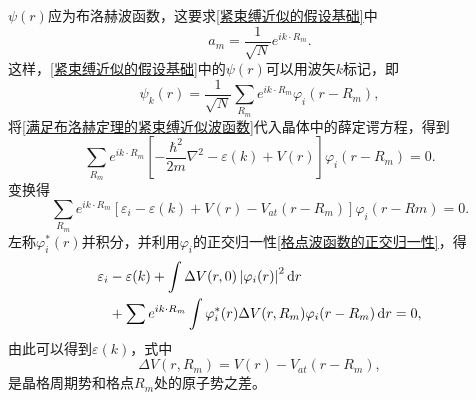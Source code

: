                 $\psi(r)$应为布洛赫波函数，这要求\autoref{紧束缚近似的假设基础}中
                \begin{equation}
                    a_m=\frac{1}{\sqrt{N}}e^{ik\cdot R_m}.
                \end{equation}
                这样，\autoref{紧束缚近似的假设基础}中的$\psi(r)$可以用波矢$k$标记，即
                \begin{equation}
                    \psi_k(r)=\frac{1}{\sqrt{N}}\sum_{R_m}e^{ik\cdot R_m}\varphi_i(r-R_m)\label{满足布洛赫定理的紧束缚近似波函数},
                \end{equation}
                将\autoref{满足布洛赫定理的紧束缚近似波函数}代入晶体中的薛定谔方程，得到
                \begin{equation}
                    \sum_{R_m}e^{ik\cdot R_m}\left[ - \frac{\hbar^2}{2m}\nabla^2 - \varepsilon(k)+V(r) \right]\varphi_i(r-R_m)=0.
                \end{equation}
                变换得
                \begin{equation}
                    \sum_{R_m}e^{ik\cdot R_m}\left[ \varepsilon_i-\varepsilon(k)+V(r)-V_{at}(r-R_m) \right]\varphi_i(r-Rm)=0.
                \end{equation}
                左称$\varphi_i^*(r)$并积分，并利用$\varphi_i$的正交归一性\autoref{格点波函数的正交归一性}，得
                \begin{equation}
                    \begin{split}
                        \varepsilon_i&-\varepsilon(k)+\int\Delta V(r,0)\left|\varphi_i(r)\right|^2\mathop{}\!\mathrm{d} r\\
                        &+\sum e^{ik\cdot R_m}\int\varphi_i^*(r)\Delta V(r,R_m)\varphi_i(r-R_m)\mathop{}\!\mathrm{d} r=0,
                    \end{split}\label{归一化的紧束缚近似薛定谔方程}
                \end{equation}
                由此可以得到$\varepsilon(k)$，式中
                \begin{equation}
                    \Delta V(r,R_m)=V(r)-V_{at}(r-R_m),
                \end{equation}
                是晶格周期势和格点$R_m$处的原子势之差。

